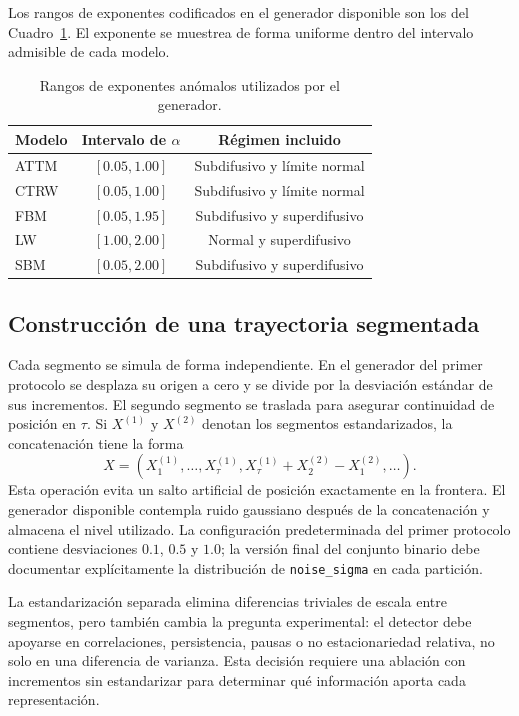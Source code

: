 \documentclass[a4paper,12pt]{article}
\begin{document}
Los rangos de exponentes codificados en el generador disponible son los del Cuadro~\ref{tab:alpha-ranges}. El exponente se muestrea de forma uniforme dentro del intervalo admisible de cada modelo.

\begin{table}[htbp]
\centering
\begin{tabular}{lcc}
\toprule
\textbf{Modelo} & \textbf{Intervalo de $\alpha$} & \textbf{Régimen incluido} \\
\midrule
ATTM & $[0.05,1.00]$ & Subdifusivo y límite normal \\
CTRW & $[0.05,1.00]$ & Subdifusivo y límite normal \\
FBM & $[0.05,1.95]$ & Subdifusivo y superdifusivo \\
LW & $[1.00,2.00]$ & Normal y superdifusivo \\
SBM & $[0.05,2.00]$ & Subdifusivo y superdifusivo \\
\bottomrule
\end{tabular}
\caption{Rangos de exponentes anómalos utilizados por el generador.}
\label{tab:alpha-ranges}
\end{table}

\subsection{Construcción de una trayectoria segmentada}

Cada segmento se simula de forma independiente. En el generador del primer protocolo se desplaza su origen a cero y se divide por la desviación estándar de sus incrementos. El segundo segmento se traslada para asegurar continuidad de posición en $\tau$. Si $X^{(1)}$ y $X^{(2)}$ denotan los segmentos estandarizados, la concatenación tiene la forma
\begin{equation}
  X=(X^{(1)}_1,\ldots,X^{(1)}_{\tau},
  X^{(1)}_{\tau}+X^{(2)}_2-X^{(2)}_1,\ldots).
  \label{eq:concatenation}
\end{equation}
Esta operación evita un salto artificial de posición exactamente en la frontera. El generador disponible contempla ruido gaussiano después de la concatenación y almacena el nivel utilizado. La configuración predeterminada del primer protocolo contiene desviaciones $0.1$, $0.5$ y $1.0$; la versión final del conjunto binario debe documentar explícitamente la distribución de \texttt{noise\_sigma} en cada partición.

La estandarización separada elimina diferencias triviales de escala entre segmentos, pero también cambia la pregunta experimental: el detector debe apoyarse en correlaciones, persistencia, pausas o no estacionariedad relativa, no solo en una diferencia de varianza. Esta decisión requiere una ablación con incrementos sin estandarizar para determinar qué información aporta cada representación.
\end{document}
